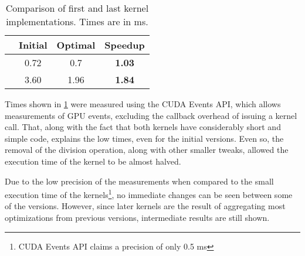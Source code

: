 
\begin{table}
	\centering
	\begin{tabular}{r|cc|c}
						&	Initial	&	Optimal	&	Speedup	\\ \hline
		\computeflux	&	0.72	&	0.7		&	\textbf{1.03}	\\
		\update			&	3.60	&	1.96	&	\textbf{1.84}	\\ \hline
	\end{tabular}
	\caption{Comparison of first and last kernel implementations. Times are in ms.}
	\label{tab:kernel_speedups}
\end{table}

Times shown in \cref{tab:kernel_speedups} were measured using the CUDA Events API, which allows measurements of GPU events, excluding the callback overhead of issuing a kernel call. That, along with the fact that both kernels have considerably short and simple code, explains the low times, even for the initial versions. Even so, the removal of the division operation, along with other smaller tweaks, allowed the execution time of the \update kernel to be almost halved.

Due to the low precision of the measurements when compared to the small execution time of the kernels\footnote{CUDA Events API claims a precision of only 0.5 ms}, no immediate changes can be seen between some of the versions. However, since later kernels are the result of aggregating most optimizations from previous versions, intermediate results are still shown.
